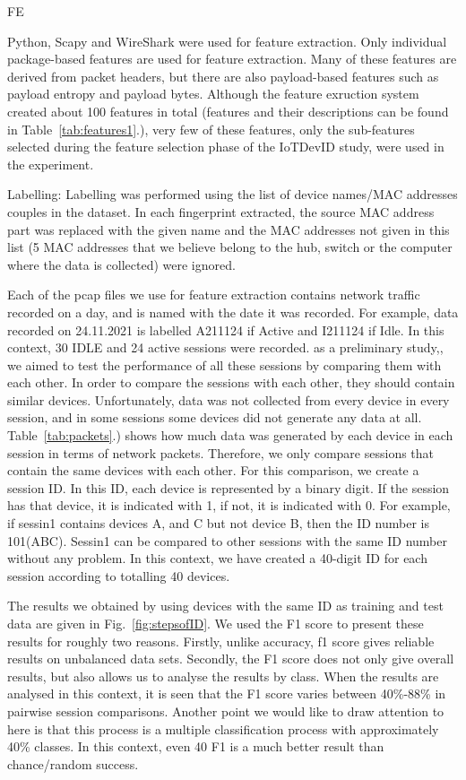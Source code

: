 \documentclass[journal]{IEEEtran}
\begin{document}
FE

Python, Scapy and WireShark were used for feature extraction. Only individual package-based features are used for feature extraction. Many of these features are derived from packet headers, but there are also payload-based features such as payload entropy and payload bytes. Although the feature exruction system created about 100 features in total (features and their descriptions can be found in Table~\ref{tab:features1}.), very few of these features, only the sub-features selected during the feature selection phase of the IoTDevID study, were used in the experiment.


Labelling:
Labelling was performed using the list of device names/MAC addresses couples in the dataset. In each fingerprint extracted, the source MAC address part was replaced with the given name and the MAC addresses not given in this list (5 MAC addresses that we believe belong to the hub, switch or the computer where the data is collected) were ignored.



Each of the pcap files we use for feature extraction contains network traffic recorded on a day, and is named with the date it was recorded.   For example, data recorded on 24.11.2021 is labelled A211124 if Active and I211124 if Idle. In this context, 30 IDLE and 24 active sessions were recorded. as a preliminary study,, we aimed to test the performance of all these sessions by comparing them with each other. In order to compare the sessions with each other, they should contain similar devices. Unfortunately, data was not collected from every device in every session, and in some sessions some devices did not generate any data at all. Table~\ref{tab:packets}.) shows how much data was generated by each device in each session in terms of network packets. Therefore, we only compare sessions that contain the same devices with each other. For this comparison, we create a session ID. In this ID, each device is represented by a binary digit. If the session has that device, it is indicated with 1, if not, it is indicated with 0. For example, if sessin1 contains devices A, and C but not device B, then the ID number is 101(ABC). Sessin1 can be compared to other sessions with the same ID number without any problem. In this context, we have created a 40-digit ID for each session according to totalling 40 devices.



The results we obtained by using devices with the same ID as training and test data are given in Fig.~\ref{fig:stepsofID}.  We used the F1 score to present these results for roughly two reasons. Firstly, unlike accuracy, f1 score gives reliable results on unbalanced data sets. Secondly, the F1 score does not only give overall results, but also allows us to analyse the results by class. When the results are analysed in this context, it is seen that the F1 score varies between 40\%-88\% in pairwise session comparisons. Another point we would like to draw attention to here is that this process is a multiple classification process with approximately 40\% classes. In this context, even 40 F1 is a much better result than chance/random success.
\end{document}
